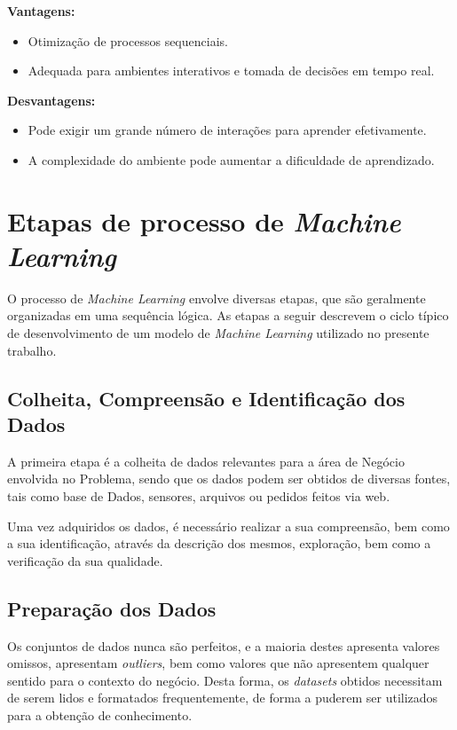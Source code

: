 \documentclass[12pt,a4paper,twoside]{report}
\begin{document}
{\textbf{Vantagens:}
\begin{itemize}
    \item Otimização de processos sequenciais.
    \item Adequada para ambientes interativos e tomada de decisões em tempo real.
\end{itemize}

\textbf{Desvantagens:}
\begin{itemize}
    \item Pode exigir um grande número de interações para aprender efetivamente.
    \item A complexidade do ambiente pode aumentar a dificuldade de aprendizado.
\end{itemize}
 
\section{Etapas de processo de \textit{Machine Learning}}

O processo de \textit{Machine Learning} envolve diversas etapas, que são geralmente organizadas em uma sequência lógica. As etapas a seguir descrevem o ciclo típico de desenvolvimento de um modelo de \textit{Machine Learning} utilizado no presente trabalho.

\subsection{Colheita, Compreensão e Identificação dos Dados}

A primeira etapa é a colheita  de dados relevantes para a área de Negócio envolvida no Problema, sendo que os dados podem ser obtidos de diversas fontes, tais como base de Dados, sensores, arquivos ou pedidos feitos via web. 

Uma vez adquiridos os dados, é necessário realizar a sua compreensão, bem como a sua identificação, através da descrição dos mesmos, exploração, bem como a verificação da sua qualidade.
\subsection{Preparação dos Dados}

Os conjuntos de dados nunca são perfeitos, e a maioria destes apresenta valores omissos, apresentam \textit{outliers}, bem como valores que não apresentem qualquer sentido para o contexto do negócio. Desta forma, os \textit{datasets} obtidos necessitam de serem lidos e formatados frequentemente, de forma a puderem ser utilizados para a obtenção de conhecimento.

}
\end{document}
